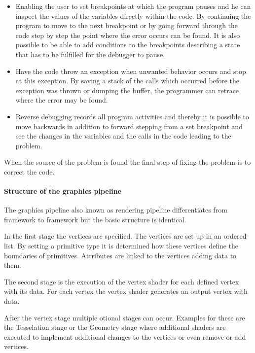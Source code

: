 \begin{itemize}

\item Enabling the user to set breakpoints at which the program pauses and he can inspect the values of the variables directly within the code. By continuing the program to move to the next breakpoint or by going forward through the code step by step the point where the error occurs can be found. It is also possible to be able to add conditions to the breakpoints describing a state that has to be fulfilled for the debugger to pause. 


\item Have the code throw an exception when unwanted behavior occurs and stop at this exception. By saving a stack of the calls which occurred before the exception was thrown or dumping the buffer, the programmer can retrace where the error may be found.


\item Reverse debugging records all program activities and thereby it is possible to move backwards in addition to forward stepping from a set breakpoint and see the changes in the variables and the calls in the code leading to the problem.

\end{itemize}

When the source of the problem is found the final step of fixing the problem is to correct the code.

\paragraph{Structure of the graphics pipeline}
\label{paragraph:pipeline}

The graphics pipeline also known as rendering pipeline differentiates from framework to framework but the basic structure is identical. 

In the first stage the vertices are specified. The vertices are set up in an ordered list. By setting a primitive type it is determined how these vertices define the boundaries of primitives. Attributes are linked to the vertices adding data to them.

The second stage is the execution of the vertex shader for each defined vertex with its data. For each vertex the vertex shader generates an output vertex with data.

After the vertex stage multiple otional stages can occur. Examples for these are the Tesselation stage or the Geometry stage where additional shaders are executed to implement additional changes to the vertices or even remove or add vertices.

